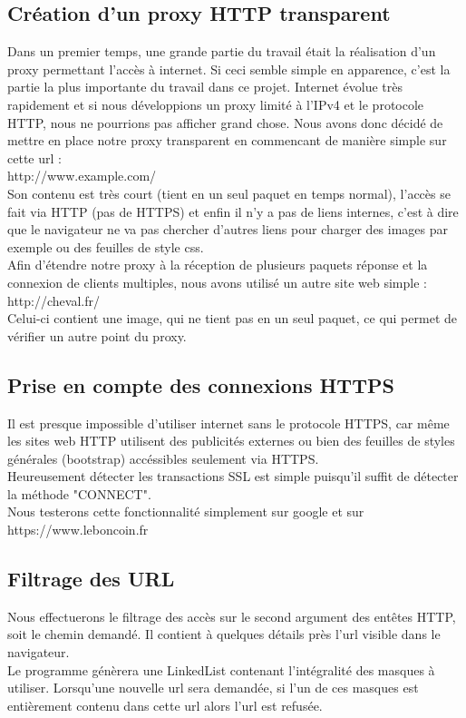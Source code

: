 \documentclass{scrreprt}
\begin{document}
\subsection{Création d'un proxy HTTP transparent}
Dans un premier temps, une grande partie du travail était la réalisation d'un proxy permettant l'accès à internet. Si ceci semble simple en apparence, c'est la partie la plus importante du travail dans ce projet. Internet évolue très rapidement et si nous développions un proxy limité à l'IPv4 et le protocole HTTP, nous ne pourrions pas afficher grand chose. Nous avons donc décidé de mettre en place notre proxy transparent en commencant de manière simple sur cette url :\\
http://www.example.com/\\
Son contenu est très court (tient en un seul paquet en temps normal), l'accès se fait via HTTP (pas de HTTPS) et enfin il n'y a pas de liens internes, c'est à dire que le navigateur ne va pas chercher d'autres liens pour charger des images par exemple ou des feuilles de style css.\\
Afin d'étendre notre proxy à la réception de plusieurs paquets réponse et la connexion de clients multiples, nous avons utilisé un autre site web simple :\\
http://cheval.fr/\\
Celui-ci contient une image, qui ne tient pas en un seul paquet, ce qui permet de vérifier un autre point du proxy.

\subsection{Prise en compte des connexions HTTPS}
Il est presque impossible d'utiliser internet sans le protocole HTTPS, car même les sites web HTTP utilisent des publicités externes ou bien des feuilles de styles générales (bootstrap) accéssibles seulement via HTTPS.\\
Heureusement détecter les transactions SSL est simple puisqu'il suffit de détecter la méthode "CONNECT".
\\
Nous testerons cette fonctionnalité simplement sur google et sur\\
https://www.leboncoin.fr

\subsection{Filtrage des URL}
Nous effectuerons le filtrage des accès sur le second argument des entêtes HTTP, soit le chemin demandé. Il contient à quelques détails près l'url visible dans le navigateur.\\
Le programme génèrera une LinkedList contenant l'intégralité des masques à utiliser. Lorsqu'une nouvelle url sera demandée, si l'un de ces masques est entièrement contenu dans cette url alors l'url est refusée.
\end{document}
